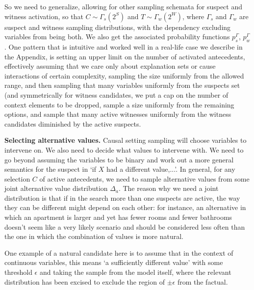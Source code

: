 \documentclass[twoside,11pt]{article}
\begin{document}
So we need to generalize, allowing for other sampling schemata for suspect and witness activation, so that $C \sim \Gamma_s(2^S)$ and $T \sim \Gamma_w(2^W)$, where $\Gamma_s$ and $\Gamma_w$ are suspect and witness sampling distributions, with the dependency excluding variables from being both. We also get the associated probability functions $p^\Gamma_s$, $p^\Gamma_w$. One pattern that is intuitive and worked well in a real-life case we describe in the Appendix, is setting an upper limit on the number of activated antecedents, effectively assuming that we care only about explanation sets or cause interactions of certain complexity, sampling the size uniformly from the allowed range, and then sampling that many variables uniformly from the suspects set (and symmetrically for witness candidates, we put a cap on the number of context elements to be dropped, sample a size uniformly from the remaining options, and sample that many active witnesses uniformly from the witness candidates diminished by the active suspects.

\vspace{2mm}
\noindent \textbf{Selecting alternative values.} Causal setting sampling will choose variables to intervene on. We also need to decide what values to intervene with.
We need to go beyond assuming the variables to be binary and work out a more general semantics for the suspect in `if $X$ had a different value,...'. In general, for any selection $C$ of active antecedents, we need to sample alternative values from some joint alternative value distribution $\Delta_a$. The reason why we need a joint distribution is that if in the search more than one suspects are active, the way they can be different might depend on each other: for instance, an alternative in which an apartment is larger and yet has fewer rooms and fewer bathrooms doesn't seem like a very likely scenario and should be considered less often than the one in which the combination of values is more natural.


One example of a natural candidate here is to assume that in the context of continuous variables, this means `a sufficiently different value' with some threshold $\epsilon$ and taking the sample from the model itself, where the relevant distribution has been excised to exclude the region of $\pm \epsilon$ from the factual. 
\end{document}
